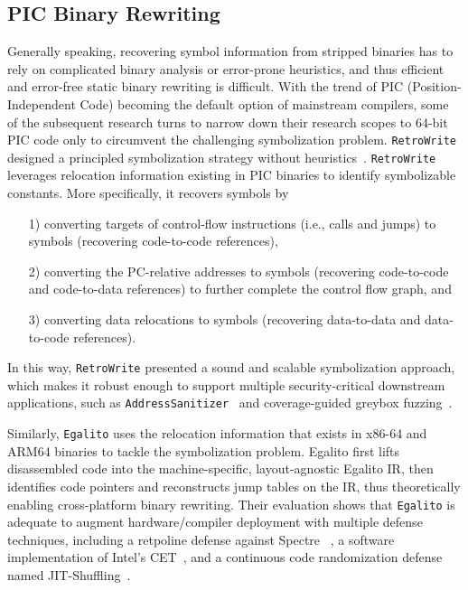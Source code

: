 \subsection{PIC Binary Rewriting} \label{sec:existing-pic}
Generally speaking, recovering symbol information from stripped binaries has to 
rely on complicated binary analysis or error-prone heuristics, and thus 
efficient and error-free static binary rewriting is difficult. With the trend 
of PIC (Position-Independent Code) becoming the default option of mainstream 
compilers, some of the subsequent research turns to narrow down their research 
scopes to 64-bit PIC code only to circumvent the challenging symbolization 
problem.
\texttt{RetroWrite} designed a principled symbolization strategy without 
heuristics~\cite{dinesh2020retrowrite}. \texttt{RetroWrite} leverages 
relocation information existing in PIC binaries to identify symbolizable 
constants. More specifically, it recovers symbols by
\begin{itemize}
  \item[1)] converting targets of control-flow instructions (i.e., calls and jumps) to symbols (recovering code-to-code references),
  \item[2)] converting the PC-relative addresses to symbols (recovering code-to-code and code-to-data references) to further complete the control flow graph, and
  \item[3)] converting data relocations to symbols (recovering data-to-data and data-to-code references).
\end{itemize}
In this way, \texttt{RetroWrite} presented a sound and scalable symbolization 
approach, which makes it robust enough to support multiple security-critical 
downstream applications, such as \texttt{AddressSanitizer}~\cite
{serebryany2012addresssanitizer} and coverage-guided greybox fuzzing~\cite
{zalewski2014american}.

Similarly, \texttt{Egalito} uses the relocation information that exists in 
x86-64 and ARM64 binaries to tackle the symbolization problem. Egalito first 
lifts disassembled code into the machine-specific, layout-agnostic Egalito IR, 
then identifies code pointers and reconstructs jump tables on the IR, thus 
theoretically enabling cross-platform binary rewriting. Their evaluation shows 
that \texttt{Egalito} is adequate to augment hardware/compiler deployment with 
multiple defense techniques, including a retpoline defense against Spectre 
~\cite{kocher2019spectre}, a software implementation of Intel’s CET~\cite{cet}, 
and a continuous code randomization defense named JIT-Shuffling~\cite
{williams2016shuffler}.

